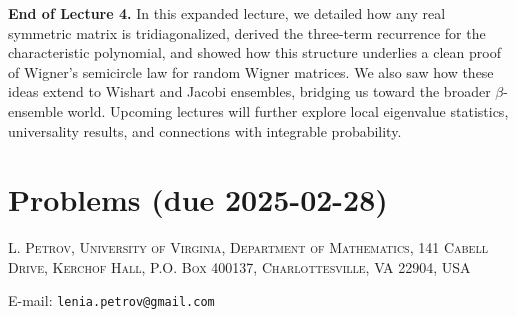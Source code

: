 \documentclass[letterpaper,11pt,oneside,reqno]{article}
\numberwithin{equation}{section}
\theoremstyle{definition}
\begin{document}
\bigskip
\noindent
\textbf{End of Lecture 4.} In this expanded lecture, we detailed how any real symmetric matrix is tridiagonalized, derived the three-term recurrence for the characteristic polynomial, and showed how this structure underlies a clean proof of Wigner’s semicircle law for random Wigner matrices. We also saw how these ideas extend to Wishart and Jacobi ensembles, bridging us toward the broader \(\beta\)-ensemble world. Upcoming lectures will further explore local eigenvalue statistics, universality results, and connections with integrable probability.





\appendix
\setcounter{section}{3}

\section{Problems (due 2025-02-28)}









\medskip

\textsc{L. Petrov, University of Virginia, Department of Mathematics, 141 Cabell Drive, Kerchof Hall, P.O. Box 400137, Charlottesville, VA 22904, USA}

E-mail: \texttt{lenia.petrov@gmail.com}
\end{document}
